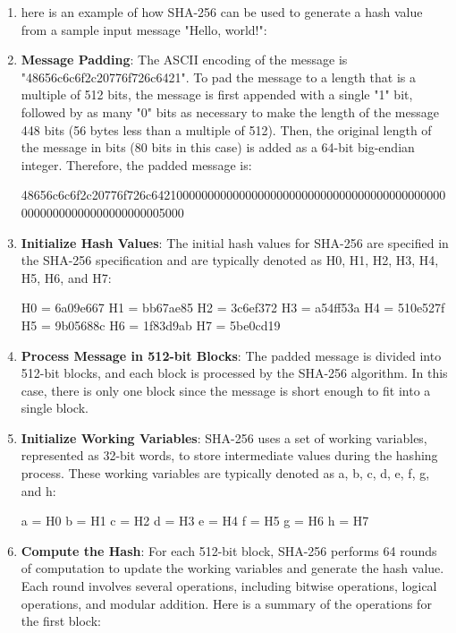 \documentclass[11pt]{article}
\begin{document}
\begin{enumerate}
    \item here is an example of how SHA-256 can be used to generate a hash value from a sample input message "Hello, world!":

    \item \textbf{Message Padding}: The ASCII encoding of the message is "48656c6c6f2c20776f726c6421". To pad the message to a length that is a multiple of 512 bits, the message is first appended with a single "1" bit, followed by as many "0" bits as necessary to make the length of the message 448 bits (56 bytes less than a multiple of 512). Then, the original length of the message in bits (80 bits in this case) is added as a 64-bit big-endian integer. Therefore, the padded message is:

          48656c6c6f2c20776f726c64210000000000000000000000000000000000000000000\\
          00000000000000000000005000

    \item \textbf{Initialize Hash Values}: The initial hash values for SHA-256 are specified in the SHA-256 specification and are typically denoted as H0, H1, H2, H3, H4, H5, H6, and H7:

          H0 = 6a09e667
          H1 = bb67ae85
          H2 = 3c6ef372
          H3 = a54ff53a
          H4 = 510e527f
          H5 = 9b05688c
          H6 = 1f83d9ab
          H7 = 5be0cd19

    \item \textbf{Process Message in 512-bit Blocks}: The padded message is divided into 512-bit blocks, and each block is processed by the SHA-256 algorithm. In this case, there is only one block since the message is short enough to fit into a single block.

    \item \textbf{Initialize Working Variables}: SHA-256 uses a set of working variables, represented as 32-bit words, to store intermediate values during the hashing process. These working variables are typically denoted as a, b, c, d, e, f, g, and h:

          a = H0
          b = H1
          c = H2
          d = H3
          e = H4
          f = H5
          g = H6
          h = H7

    \item \textbf{Compute the Hash}: For each 512-bit block, SHA-256 performs 64 rounds of computation to update the working variables and generate the hash value. Each round involves several operations, including bitwise operations, logical operations, and modular addition. Here is a summary of the operations for the first block:


\end{enumerate}
\end{document}

